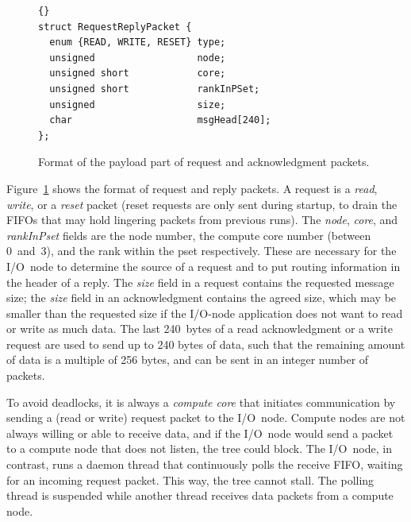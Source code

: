 \documentclass[conference]{worldcomp}
\begin{document}
\begin{figure}[h]
\begin{lstlisting}{}
struct RequestReplyPacket {
  enum {READ, WRITE, RESET} type;
  unsigned                  node;
  unsigned short            core;
  unsigned short            rankInPSet;
  unsigned                  size;
  char                      msgHead[240];
};
\end{lstlisting}
\caption{Format of the payload part of request and acknowledgment packets.}
\label{fig:control-packet-format}
\end{figure}

Figure~\ref{fig:control-packet-format} shows the format of request and reply
packets.
A request is a \emph{read}, \emph{write}, or a \emph{reset\/} packet
(reset requests are only sent during startup, to drain the FIFOs that may hold
lingering packets from previous runs).
The \emph{node}, \emph{core}, and \emph{rankInPset} fields are the node number,
the compute core number (between 0~and~3), and the rank within the pset
respectively.
These are necessary for the I/O~node to determine the source of a request
and to put routing information in the header of a reply.
The \emph{size} field in a request contains the requested message size;
the \emph{size} field in an acknowledgment contains the agreed size, which
may be smaller than the requested size if the I/O-node application does not
want to read or write as much data.
The last 240~bytes of a read acknowledgment or a write request are used to
send up to 240 bytes of data, such that the remaining amount of data is a
multiple of 256 bytes, and can be sent in an integer number of packets.

To avoid deadlocks, it is always a \emph{compute core\/} that initiates
communication by sending a (read or write) request packet to the I/O~node.
Compute nodes are not always willing or able to receive data, and
if the I/O~node would send a packet to a compute node that does not listen,
the tree could block.
The I/O~node, in contrast, runs a daemon thread that continuously polls the
receive FIFO, waiting for an incoming request packet.
This way, the tree cannot stall.
The polling thread is suspended while another thread receives data packets
from a compute node.
\end{document}
